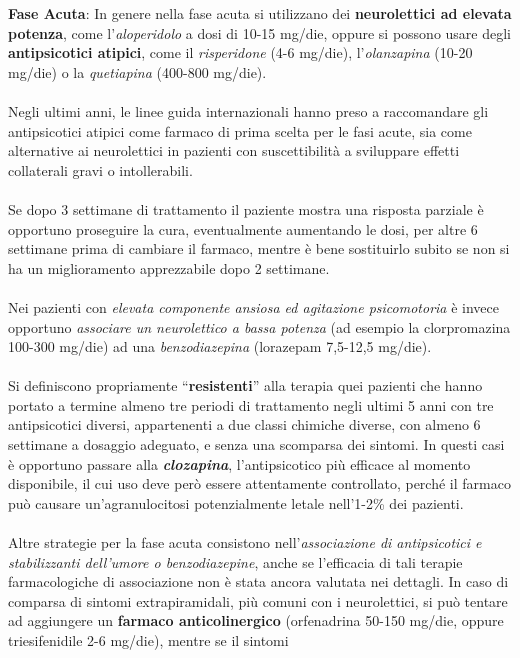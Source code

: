 \begin{itemize}
\textbf{Fase Acuta}: In genere nella fase acuta si utilizzano dei
\textbf{neurolettici ad elevata potenza}, come l'\emph{aloperidolo} a
dosi di 10-15 mg/die, oppure si possono usare degli
\textbf{antipsicotici atipici}, come il \emph{risperidone} (4-6 mg/die),
l'\emph{olanzapina} (10-20 mg/die) o la \emph{quetiapina} (400-800
mg/die).
\\\\
Negli ultimi anni, le linee guida internazionali hanno preso a
raccomandare gli antipsicotici atipici come farmaco di prima scelta per
le fasi acute, sia come alternative ai neurolettici in pazienti con
suscettibilità a sviluppare effetti collaterali gravi o intollerabili.
\\\\
Se dopo 3 settimane di trattamento il paziente mostra una risposta
parziale è opportuno proseguire la cura, eventualmente aumentando le
dosi, per altre 6 settimane prima di cambiare il farmaco, mentre è bene
sostituirlo subito se non si ha un miglioramento apprezzabile dopo 2
settimane.
\\\\
Nei pazienti con \emph{elevata componente ansiosa ed agitazione
psicomotoria} è invece opportuno \emph{associare un neurolettico a bassa
potenza} (ad esempio la clorpromazina 100-300 mg/die) ad una
\emph{benzodiazepina} (lorazepam 7,5-12,5 mg/die).
\\\\
Si definiscono propriamente ``\textbf{resistenti}'' alla terapia quei
pazienti che hanno portato a termine almeno tre periodi di trattamento
negli ultimi 5 anni con tre antipsicotici diversi, appartenenti a due
classi chimiche diverse, con almeno 6 settimane a dosaggio adeguato, e
senza una scomparsa dei sintomi. In questi casi è opportuno passare alla
\textbf{\emph{clozapina}}, l'antipsicotico più efficace al momento
disponibile, il cui uso deve però essere attentamente controllato,
perché il farmaco può causare un'agranulocitosi potenzialmente letale
nell'1-2\% dei pazienti.
\\\\
Altre strategie per la fase acuta consistono nell'\emph{associazione di
antipsicotici e stabilizzanti dell'umore o benzodiazepine}, anche se
l'efficacia di tali terapie farmacologiche di associazione non è stata
ancora valutata nei dettagli. In caso di comparsa di sintomi
extrapiramidali, più comuni con i neurolettici, si può tentare ad
aggiungere un \textbf{farmaco anticolinergico} (orfenadrina 50-150
mg/die, oppure triesifenidile 2-6 mg/die), mentre se il sintomi

\end{itemize}
